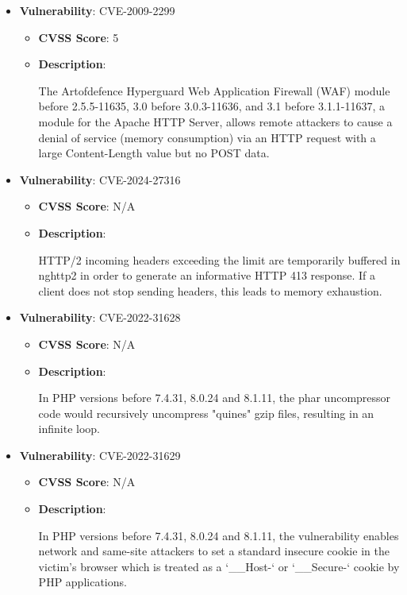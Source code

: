 \documentclass{article}
\begin{document}
\begin{itemize}
    
        \item \textbf{Vulnerability}: CVE-2009-2299
        \begin{itemize}
            \item \textbf{CVSS Score}:  5 
            \item \textbf{Description}:
            \parbox[t]{0.9\linewidth}{
                \ttfamily The Artofdefence Hyperguard Web Application Firewall (WAF) module before 2.5.5-11635, 3.0 before 3.0.3-11636, and 3.1 before 3.1.1-11637, a module for the Apache HTTP Server, allows remote attackers to cause a denial of service (memory consumption) via an HTTP request with a large Content-Length value but no POST data.
            }
        \end{itemize}
    
        \item \textbf{Vulnerability}: CVE-2024-27316
        \begin{itemize}
            \item \textbf{CVSS Score}:  N/A 
            \item \textbf{Description}:
            \parbox[t]{0.9\linewidth}{
                \ttfamily HTTP/2 incoming headers exceeding the limit are temporarily buffered in nghttp2 in order to generate an informative HTTP 413 response. If a client does not stop sending headers, this leads to memory exhaustion.
            }
        \end{itemize}
    
        \item \textbf{Vulnerability}: CVE-2022-31628
        \begin{itemize}
            \item \textbf{CVSS Score}:  N/A 
            \item \textbf{Description}:
            \parbox[t]{0.9\linewidth}{
                \ttfamily In PHP versions before 7.4.31, 8.0.24 and 8.1.11, the phar uncompressor code would recursively uncompress "quines" gzip files, resulting in an infinite loop.
            }
        \end{itemize}
    
        \item \textbf{Vulnerability}: CVE-2022-31629
        \begin{itemize}
            \item \textbf{CVSS Score}:  N/A 
            \item \textbf{Description}:
            \parbox[t]{0.9\linewidth}{
                \ttfamily In PHP versions before 7.4.31, 8.0.24 and 8.1.11, the vulnerability enables network and same-site attackers to set a standard insecure cookie in the victim's browser which is treated as a `\_\_Host-` or `\_\_Secure-` cookie by PHP applications.
            }
        \end{itemize}
    

\end{itemize}
\end{document}

